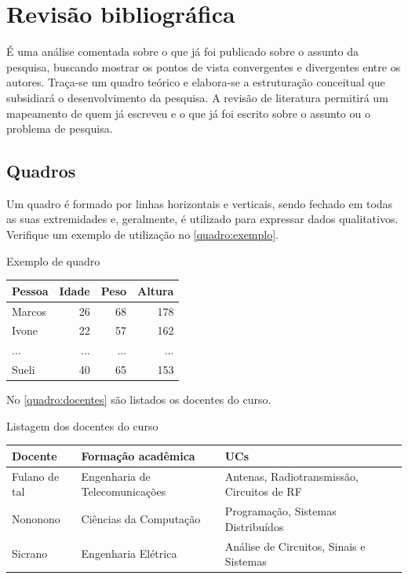 \chapter{Revisão bibliográfica}\label{cap:revisao}

É uma análise comentada sobre o que já foi publicado sobre o assunto da pesquisa, buscando mostrar os pontos de vista convergentes e divergentes entre os autores. Traça-se um quadro teórico e elabora-se a estruturação conceitual que subsidiará o desenvolvimento da pesquisa. A revisão de literatura permitirá um mapeamento de quem já escreveu e o que já foi escrito sobre o assunto ou o problema de pesquisa.


\section{Quadros}\label{sec:quadros}


Um quadro é formado por linhas horizontais e verticais, sendo fechado em todas as suas extremidades e, geralmente, é utilizado para expressar dados qualitativos. Verifique um exemplo de utilização no \autoref{quadro:exemplo}.


\begin{quadro}[htb]
\caption{Exemplo de quadro}\label{quadro:exemplo}
\begin{tabular}{|l|r|r|r|}
    \hline
    \textbf{Pessoa} & \textbf{Idade} & \textbf{Peso} & \textbf{Altura} \\ \hline
    Marcos & 26    & 68   & 178    \\ \hline
    Ivone  & 22    & 57   & 162    \\ \hline
    ...    & ...   & ...  & ...    \\ \hline
    Sueli  & 40    & 65   & 153    \\ \hline
\end{tabular}
\fonteproprioautor
\end{quadro}

No \autoref{quadro:docentes} são listados os docentes do curso.

\begin{quadro}[htb]
    \centering
    \caption{Listagem dos docentes do curso}\label{quadro:docentes}
    \footnotesize
    \begin{tabular}{|l|l|l|}
    \hline
    \textbf{Docente} & \textbf{Formação acadêmica}    & \textbf{UCs}                               \\ \hline
    Fulano de tal    & Engenharia de Telecomunicações & Antenas, Radiotransmissão, Circuitos de RF \\ \hline
    Nononono         & Ciências da Computação         & Programação, Sistemas Distribuídos         \\ \hline
    Sicrano          & Engenharia Elétrica            & Análise de Circuitos, Sinais e Sistemas    \\ \hline
    \end{tabular}
    \fonteproprioautor
\end{quadro}


